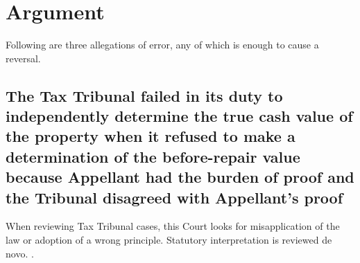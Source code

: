 \documentclass[12pt,\documentclassflag]{michiganCourtOfAppealsBrief}
\begin{document}




\section{Argument}
 
Following are three allegations of error, any of which is enough to cause a reversal.

\subsection{The Tax Tribunal failed in its duty to independently determine the true cash value of the property when it refused to make a determination of the before-repair value because Appellant had the burden of proof and the Tribunal disagreed with Appellant's proof 
}

When reviewing Tax Tribunal cases, this Court looks for misapplication of the law or adoption of a wrong principle. Statutory interpretation is reviewed de novo. . 
\end{document}
